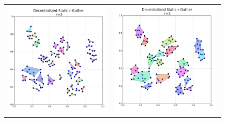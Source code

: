 \begin{figure}[htpb]
\begin{center}
\begin{tabular}{cc}
\vspace*{-8mm}
	\includegraphics[scale=0.25]{figs/r3.png} &
	\includegraphics[scale=0.25]{figs/r5.png} \\

\end{tabular}
\end{center}
\end{figure}
